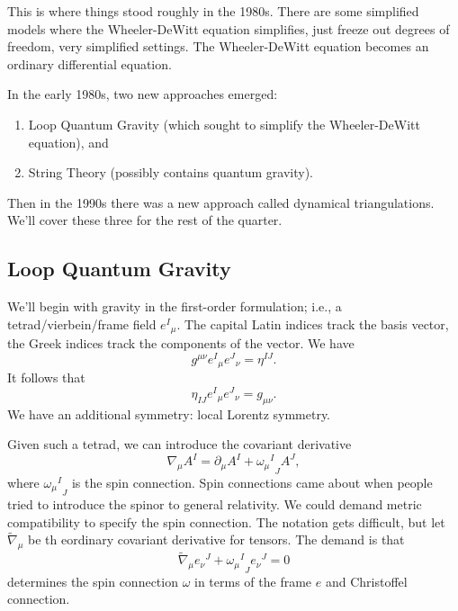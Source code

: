 This is where things stood roughly in the 1980s. There are some
simplified models where the Wheeler-DeWitt equation simplifies, just
freeze out degrees of freedom, very simplified settings. The
Wheeler-DeWitt equation becomes an ordinary differential equation.

In the early 1980s, two new approaches emerged:
\begin{enumerate}
\item Loop Quantum Gravity (which sought to simplify the Wheeler-DeWitt
  equation), and
\item String Theory (possibly contains quantum gravity).
\end{enumerate}
Then in the 1990s there was a new approach called dynamical
triangulations. We'll cover these three for the rest of the quarter.

\subsection{Loop Quantum Gravity}

We'll begin with gravity in the first-order formulation; i.e., a
tetrad/vierbein/frame field ${e^{I}}_{\mu}$. The capital Latin indices
track the basis vector, the Greek indices track the components of the
vector. We have
\begin{equation}
g^{\mu\nu}{e^{I}}_{\mu}{e^{J}}_{\nu}=\eta^{IJ}.
\end{equation}
It follows that
\begin{equation}
\eta_{IJ}{e^{I}}_{\mu}{e^{J}}_{\nu} = g_{\mu\nu}.
\end{equation}
We have an additional symmetry: local Lorentz symmetry.

Given such a tetrad, we can introduce the covariant derivative
\begin{equation}
\nabla_{\mu}A^{I} = \partial_{\mu}A^{I} + {{\omega_{\mu}}^{I}}_{J}A^{J},
\end{equation}
where ${{\omega_{\mu}}^{I}}_{J}$ is the spin connection.
Spin connections came about when people tried to introduce the spinor to
general relativity. We could demand metric compatibility to specify the
spin connection. The notation gets difficult, but let
$\widetilde{\nabla}_{\mu}$ be th eordinary covariant derivative for
tensors. The demand is that
\begin{equation}
\widetilde{\nabla}_{\mu}{e_{\nu}}^{J} +
          {{\omega_{\mu}}^{I}}_{J}{e_{\nu}}^{J} = 0
\end{equation}
determines the spin connection $\omega$ in terms of the frame $e$ and
Christoffel connection.

